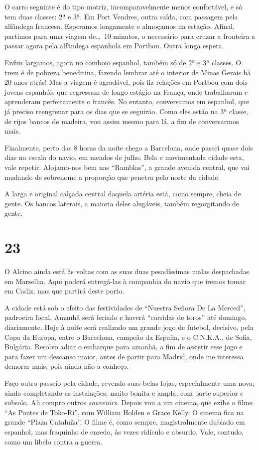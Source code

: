 O carro seguinte é do tipo motriz, incomparavelmente menos confortável, e só tem duas classes: 2ª e 3ª. Em Port Vendres, outra saída, com passagem pela alfândega francesa. Esperamos longamente e almoçamos na estação. Afinal, partimos para uma viagem de\ldots\ 10 minutos, o necessário para cruzar a fronteira a passar agora pela alfândega espanhola em Portbou. Outra longa espera.

Enfim largamos, agora no comboio espanhol, também só de 2ª e 3ª classes. O trem é de pobreza beneditina, fazendo lembrar até o interior de Minas Gerais há 20 anos atrás! Mas a viagem é agradável, pois fiz relações em Portbou com dois jovens espanhóis que regressam de longo estágio na França, onde trabalharam e aprenderam perfeitamente o francês. No entanto, conversamos em espanhol, que já preciso reengrenar para os dias que se seguirão. Como eles estão na 3ª classe, de rijos bancos de madeira, vou assim mesmo para lá, a fim de conversarmos mais.

Finalmente, perto das 8 horas da noite chego a Barcelona, onde passei quase dois dias na escala do navio, em meados de julho. Bela e movimentada cidade esta, vale repetir. Alojamo-nos bem nas ``Ramblas'', a grande avenida central, que vai mudando de sobrenome a proporção que penetra pelo norte da cidade.

A larga e original calçada central daquela artéria está, como sempre, cheia de gente. Os bancos laterais, a maioria deles alugáveis, também regorgitando de gente.

\section*{23 \adfflatleafright {}}
O Alcino ainda está às voltas com as suas duas pesadíssimas malas despachadas em Marselha. Aqui poderá entregá-las à companhia do navio que iremos tomar em Cadiz, mas que partirá deste porto.

A cidade está sob o efeito das festividades de ``Nuestra Señora De La Merced'', padroeira local. Amanhã será feriado e haverá ``corridas de toros'' até domingo, diariamente. Hoje à noite será realizado um grande jogo de futebol, decisivo, pela Copa da Europa, entre o Barcelona, campeão da España, e o C.N.K.A., de Sofia, Bulgária. Resolvo adiar o embarque para amanhã, a fim de assistir esse jogo e para fazer um descanso maior, antes de partir para Madrid, onde me interessa demorar mais, pois ainda não a conheço.

Faço outro passeio pela cidade, revendo suas belas lojas, especialmente uma nova, ainda completando as instalações, muito bonita e ampla, com parte superior e subsolo. Ali compro outros \textit{souvenirs}. Depois vou a um cinema, que exibe o filme ``As Pontes de Toko-Ri'', com William Holden e Grace Kelly. O cinema fica na grande ``Plaza Cataluña''. O filme é, como sempre, magistralmente dublado em espanhol, mas fraquinho de enredo, às vezes ridículo e absurdo. Vale, contudo, como um libelo contra a guerra.

